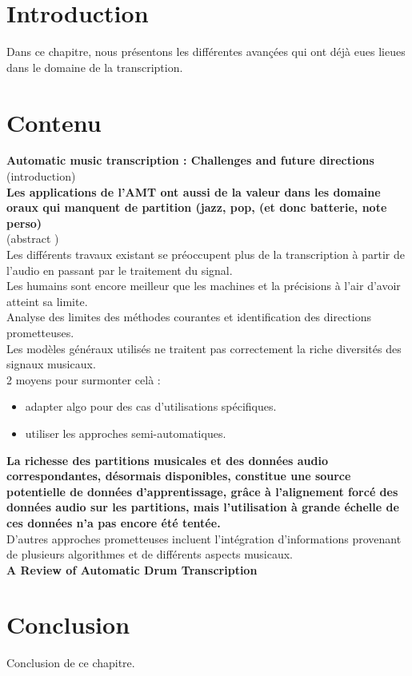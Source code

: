 \section{Introduction}

Dans ce chapitre, nous présentons les différentes avançées qui ont déjà eues lieues dans le domaine de la transcription.

\section{Contenu}
\textbf{Automatic music transcription : Challenges and future directions} \cite{article1}\\
(introduction\cite{article1})\\
\textbf{Les applications de l’AMT ont aussi de la valeur dans les domaine oraux qui manquent de partition (jazz, pop, (et donc batterie, note perso)}\\
(abstract \cite{article1})\\
Les différents travaux existant se préoccupent plus de la transcription à partir de l’audio en passant par le traitement du signal.\\
Les humains sont encore meilleur que les machines et la précisions à l’air d’avoir atteint sa limite.\\
Analyse des limites des méthodes courantes et identification des directions prometteuses.\\
Les modèles généraux utilisés ne traitent pas correctement la riche diversités des signaux musicaux.\\
2 moyens pour surmonter celà :
\begin{itemize}
	\item adapter algo pour des cas d’utilisations spécifiques.
	\item utiliser les approches semi-automatiques.
\end{itemize}
\textbf{La richesse des partitions musicales et des données audio correspondantes, désormais disponibles, constitue une source potentielle de données d'apprentissage, grâce à l'alignement forcé des données audio sur les partitions, mais l'utilisation à grande échelle de ces données n'a pas encore été tentée.}\\
D'autres approches prometteuses incluent l'intégration
d'informations provenant de plusieurs algorithmes et de différents aspects musicaux.\\
\textbf{A Review of Automatic Drum Transcription}\cite{8350302}
\section{Conclusion}
Conclusion de ce chapitre.